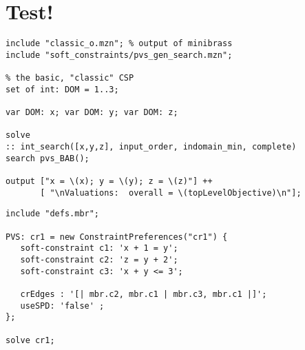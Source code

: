 \documentclass{article}
\begin{document}

\section{Test!}

\begin{lstlisting}
include "classic_o.mzn"; % output of minibrass
include "soft_constraints/pvs_gen_search.mzn"; 

% the basic, "classic" CSP 
set of int: DOM = 1..3;

var DOM: x; var DOM: y; var DOM: z;

solve 
:: int_search([x,y,z], input_order, indomain_min, complete)
search pvs_BAB();

output ["x = \(x); y = \(y); z = \(z)"] ++ 
       [ "\nValuations:  overall = \(topLevelObjective)\n"];

\end{lstlisting}

\begin{lstlisting}
include "defs.mbr";

PVS: cr1 = new ConstraintPreferences("cr1") {
   soft-constraint c1: 'x + 1 = y';
   soft-constraint c2: 'z = y + 2';
   soft-constraint c3: 'x + y <= 3';
   
   crEdges : '[| mbr.c2, mbr.c1 | mbr.c3, mbr.c1 |]';
   useSPD: 'false' ;
}; 

solve cr1;
\end{lstlisting}
\end{document}
